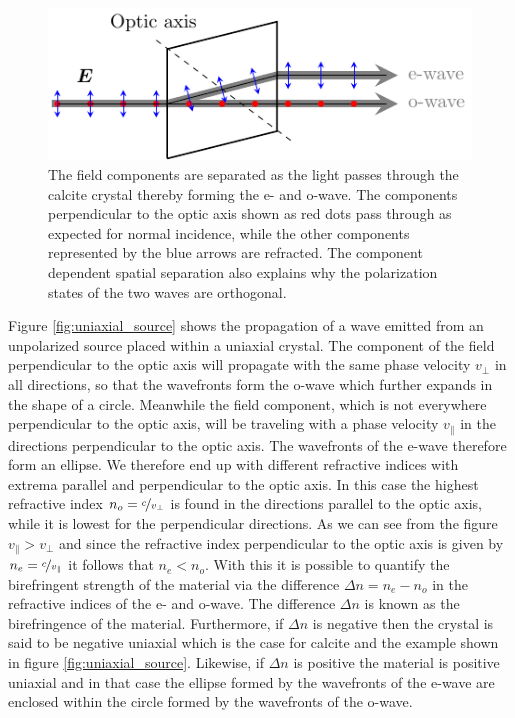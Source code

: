 \begin{figure}[h]
    \centering
    \includegraphics[scale=0.95]{images/theory/tikz_calcite_beams.pdf}
    \caption{The field components are separated as the light passes through the calcite crystal thereby forming the e- and o-wave. The components perpendicular to the optic axis shown as red dots pass through as expected for normal incidence, while the other components represented by the blue arrows are refracted. The component dependent spatial separation also explains why the polarization states of the two waves are orthogonal.}
    \label{fig:calcite_beams}
\end{figure}
Figure \ref{fig:uniaxial_source} shows the propagation of a wave emitted from an unpolarized source placed within a uniaxial crystal. The component of the field perpendicular to the optic axis will propagate with the same phase velocity $v_{\bot}$ in all directions, so that the wavefronts form the o-wave which further expands in the shape of a circle. Meanwhile the field component, which is not everywhere perpendicular to the optic axis, will be traveling with a phase velocity $v_{\parallel}$ in the directions perpendicular to the optic axis. The wavefronts of the e-wave therefore form an ellipse. We therefore end up with different refractive indices with extrema parallel and perpendicular to the optic axis. In this case the highest refractive index $n_o = \nicefrac{c}{v_{\bot}}$ is found in the directions parallel to the optic axis, while it is lowest for the perpendicular directions. As we can see from the figure $v_{\parallel} > v_{\bot}$ and since the refractive index perpendicular to the optic axis is given by $n_e = \nicefrac{c}{v_{\parallel}}$ it follows that $n_e < n_o$. With this it is possible to quantify the birefringent strength of the material via the difference $\Delta n = n_e - n_o$ in the refractive indices of the e- and o-wave. The difference $\Delta n$ is known as the birefringence of the material. Furthermore, if $\Delta n$ is negative then the crystal is said to be negative uniaxial which is the case for calcite and the example shown in figure \ref{fig:uniaxial_source}. Likewise, if $\Delta n$ is positive the material is positive uniaxial and in that case the ellipse formed by the wavefronts of the e-wave are enclosed within the circle formed by the wavefronts of the o-wave. 

